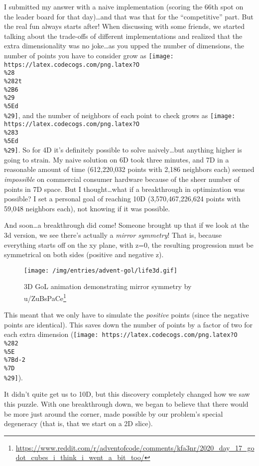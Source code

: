 \documentclass[]{article}
\renewcommand{\href}[2]{#2\footnote{\url{#1}}}
\begin{document}
I submitted my answer with a naive implementation (scoring the 66th spot on the
leader board for that day)\ldots and that was that for the ``competitive'' part.
But the real fun always starts after! When discussing with some friends, we
started talking about the trade-offs of different implementations and realized
that the extra dimensionality was no joke\ldots as you upped the number of
dimensions, the number of points you have to consider grow as
\texttt{[image: https://latex.codecogs.com/png.latex?O\\\%28\\\%282t\\\%2B6\\\%29\\\%5Ed\\\%29]},
and the number of neighbors of each point to check grows as
\texttt{[image: https://latex.codecogs.com/png.latex?O\\\%283\\\%5Ed\\\%29]}. So for
4D it's definitely possible to solve naively\ldots but anything higher is going
to strain. My naive solution on 6D took three minutes, and 7D in a reasonable
amount of time (612,220,032 points with 2,186 neighbors each) seemed
\emph{impossible} on commercial consumer hardware because of the sheer number of
points in 7D space. But I thought\ldots what if a breakthrough in optimization
was possible? I set a personal goal of reaching 10D (3,570,467,226,624 points
with 59,048 neighbors each), not knowing if it was possible.

And soon\ldots a breakthrough did come! Someone brought up that if we look at
the 3d version, we see there's actually a \emph{mirror symmetry}! That is,
because everything starts off on the xy plane, with z=0, the resulting
progression must be symmetrical on both sides (positive and negative z).

\begin{figure}
\centering
\texttt{[image: /img/entries/advent-gol/life3d.gif]}
\caption{3D GoL animation demonstrating mirror symmetry by
\href{https://www.reddit.com/r/adventofcode/comments/kfa3nr/2020_day_17_godot_cubes_i_think_i_went_a_bit_too/}{u/ZuBsPaCe}}
\end{figure}

This meant that we only have to simulate the \emph{positive} points (since the
negative points are identical). This saves down the number of points by a factor
of two for each extra dimension
(\texttt{[image: https://latex.codecogs.com/png.latex?O\\\%282\\\%5E\\\%7Bd-2\\\%7D\\\%29]}).

It didn't quite get us to 10D, but this discovery completely changed how we saw
this puzzle. With one breakthrough down, we began to believe that there would be
more just around the corner, made possible by our problem's special degeneracy
(that is, that we start on a 2D slice).
\end{document}
